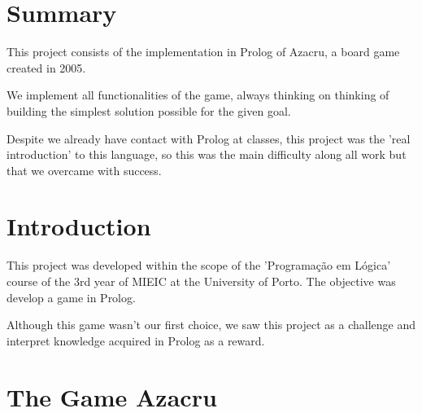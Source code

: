 \documentclass[a4paper]{article}
\begin{document}

\newpage

\section*{Summary}
This project consists of the implementation in Prolog of Azacru, a board game created in 2005.

We implement all functionalities of the game, always thinking on thinking of building the simplest solution possible for the given goal. 

Despite we already have contact with Prolog at classes, this project was the 'real introduction' to this language, so this was the main difficulty along all work but that we overcame with success.


\newpage

\tableofcontents



\newpage

\section{Introduction}
This project was developed within the scope of the 'Programação em Lógica' course of the 3rd year of MIEIC at the University of Porto. The objective was develop a game in Prolog.

Although this game wasn't our first choice, we saw this project as a challenge and interpret knowledge acquired in Prolog as a reward.



\vspace{10mm}
\section{The Game Azacru}
\end{document}
